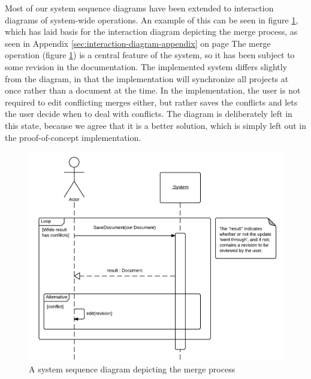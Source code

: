 Most of our system sequence diagrams have been extended to interaction diagrams of system-wide operations. 
An example of this can be seen in figure \ref{fig:merge-ssd}, 
which has laid basis for the interaction diagram depicting the merge process, 
as seen in Appendix \ref{sec:interaction-diagram-appendix} on page \pageref{fig:uc7-interaction-diagram}
The merge operation (figure \ref{fig:merge-ssd}) is a central feature of the \SOP{} 
system, so it has been subject to some revision in the documentation.
The implemented system differs slightly from the diagram, in that the implementation will synchronize all projects at once rather than a document at the time. 
In the implementation, the user is not required to edit conflicting merges either, but rather 
saves the conflicts and lets the user decide when to deal with conflicts.
The diagram is deliberately left in this state, because we agree that it is a better solution, which is simply left out in the proof-of-concept \SOP{} implementation.

\begin{figure}[hbt]
	\centering
	\includegraphics[width=1\textwidth]{Software_analysis/graphics/Merge-ssd.png}
	\caption{A system sequence diagram depicting the merge process}
	\label{fig:merge-ssd}
\end{figure}
